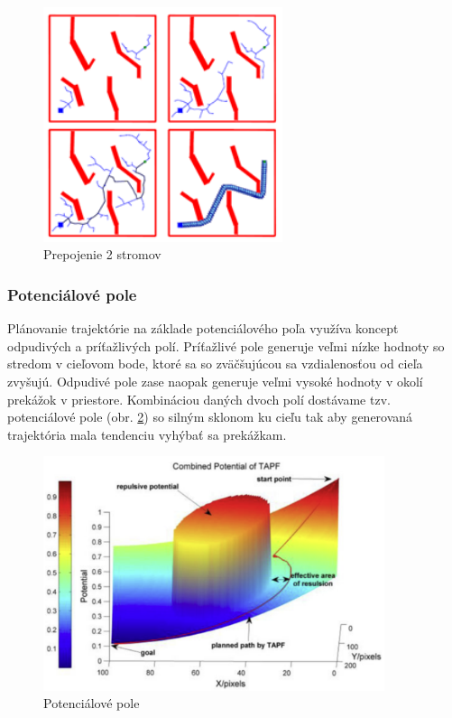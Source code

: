 \begin{figure}[h]
	\centering
	\includegraphics[width=70mm]{img/RRT-connect.png}
	\caption{Prepojenie 2 stromov \cite{}}\label{OBRAZOK 1.2.3} 
\end{figure} 

\subsubsection{Potenciálové pole}
\label{kap:1.2.4}

Plánovanie trajektórie na základe potenciálového poľa využíva koncept odpudivých a príťažlivých polí. Príťažlivé pole generuje veľmi nízke hodnoty so stredom v cieľovom bode, ktoré sa so zväčšujúcou sa vzdialenosťou od cieľa zvyšujú. Odpudivé pole zase naopak generuje veľmi vysoké hodnoty v okolí prekážok v priestore. Kombináciou daných dvoch polí dostávame tzv. potenciálové pole (obr. \ref{OBRAZOK 1.2.4}) so silným sklonom ku cieľu tak aby generovaná trajektória mala tendenciu vyhýbať sa prekážkam.

\begin{figure}[h]
	\centering
	\includegraphics[width=100mm]{img/Potencialove_pole2.png}
	\caption{Potenciálové pole \cite{}}\label{OBRAZOK 1.2.4} 
\end{figure} 